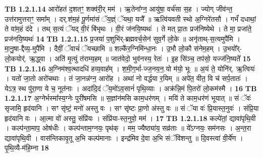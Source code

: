 \documentclass[17pt]{extarticle}
\begin{document}
                  \newline
                                \textbf{ TB 1.2.1.14} \newline
                  आरो॑हतं द॒शतꣳ॒॒ शक्व॑री॒र् मम॑ । ऋ॒तेना᳚ग्न॒ आयु॑षा॒ वर्च॑सा स॒ह । ज्योग् जीव॑न्त॒ उत्त॑रामुत्तराꣳ॒॒ समा᳚म् । दर्.श॑म॒हं पू॒र्णमा॑सं ॅय॒ज्ञ्ं ॅयथा॒ यजै᳚ ॥ ऋत्वि॑यवती स्थो अ॒ग्निरे॑तसौ । गर्भं॑ दधाथां॒ ते वा॑म॒हं द॑दे । तथ् स॒त्यं ॅयद् वी॒रं बि॑भृथः । वी॒रं ज॑नयि॒ष्यथः॑ । ते मत् प्रा॒तः प्रज॑निष्येथे । ते मा॒ प्रजा॑ते॒ प्रज॑नयि॒ष्यथः॑ \textbf{ 14} \newline
                  \newline
                                \textbf{ TB 1.2.1.15} \newline
                  प्र॒जया॑ प॒शुभि॑र्-ब्रह्मवर्च॒सेन॑ सुव॒र्गे लो॒के ॥ अनृ॑ताथ्-स॒त्यमुपै॑मि । मा॒नु॒षा-द्दैव्य॒-मुपै॑मि । दैवीं॒ ॅवाचं॑ ॅयच्छामि ॥ शल्कै॑र॒ग्निमि॑न्धा॒नः । उ॒भौ लो॒कौ स॑नेम॒हम् । उ॒भयो᳚र्-लो॒कयोर्॑. ऋ॒द्ध्वा । अति॑ मृ॒त्युं त॑राम्य॒हम् ॥ जात॑वेदो॒ भुव॑नस्य॒ रेतः॑ । इ॒ह सि॑ञ्च॒ तप॑सो॒ यज्ज॑नि॒ष्यते᳚ \textbf{ 15} \newline
                  \newline
                                \textbf{ TB 1.2.1.16} \newline
                  अ॒ग्निम॑श्व॒त्थादधि॑ हव्य॒वाह᳚म् । श॒मी॒ग॒र्भा-ज्ज॒नय॒न॒.यो म॑यो॒ भूः ॥ अ॒यं ते॒ योनि॑र्. ऋ॒त्वियः॑ । यतो॑ जा॒तो अरो॑चथाः । तं जा॒नन्न॑ग्न॒ आरो॑ह । अथा॑ नो वर्द्धया र॒यिम् ॥ अपे॑त॒ वीत॒ वि च॑ सर्प॒तातः॑ । येऽत्र॒ स्थ पु॑रा॒णा ये च॒ नूत॑नाः । अदा॑दि॒दं ॅय॒मो॑ऽव॒सानं॑ पृथि॒व्याः । अक्र॑न्नि॒मं पि॒तरो॑ लो॒कम॑स्मै । \textbf{ 16} \newline
                  \newline
                                \textbf{ TB 1.2.1.17} \newline
                  अ॒ग्नेर्भस्मा᳚स्य॒ग्नेः पुरी॑षमसि ॥ स॒ज्ञांन॑मसि काम॒धर॑णम् । मयि॑ ते काम॒धर॑णं भूयात् ॥ सं ॅवः॑ सृजामि॒ हृद॑यानि । सꣳ सृ॑ष्टं॒ मनो॑ अस्तु वः । सꣳ सृ॑ष्टः प्रा॒णो अ॑स्तु वः ॥ सं ॅया वः॑ प्रि॒यास्त॒नुवः॑ । संप्रि॒या हृद॑यानि वः । आ॒त्मा वो॑ अस्तु॒ संप्रि॑यः । संप्रि॑या-स्त॒नुवो॒ मम॑ । \textbf{ 17} \newline
                  \newline
                                \textbf{ TB 1.2.1.18} \newline
                  कल्पे॑तां॒ द्यावा॑पृथि॒वी । कल्प॑न्ता॒माप॒ ओष॑धीः । कल्प॑न्ताम॒ग्नयः॒ पृथ॑क् । मम॒ ज्यैष्ठ्या॑य॒ सव्र॑ताः ॥ ये᳚ऽग्नयः॒ सम॑नसः । अ॒न्त॒रा द्यावा॑पृथि॒वी । वास॑न्तिकावृ॒तू अ॒भि कल्प॑मानाः । इन्द्र॑मिव दे॒वा अ॒भि संॅवि॑शन्तु ॥ दि॒वस्त्वा॑ वी॒र्ये॑ण । पृ॒थि॒व्यै-म॑हि॒म्ना \textbf{ 18} \newline
\end{document}
